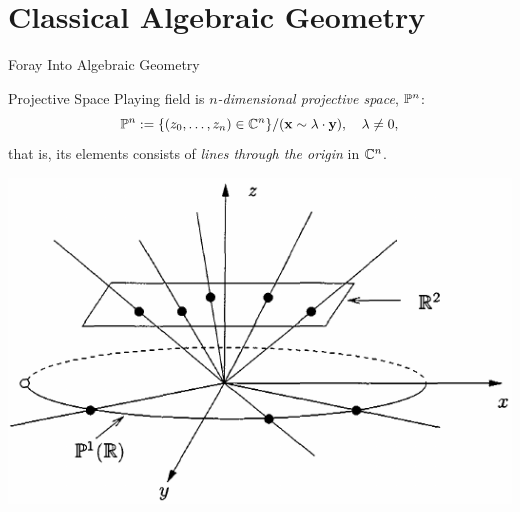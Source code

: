 \section{Classical Algebraic Geometry}

\begin{frame}{Foray Into Algebraic Geometry}
    \begin{block}{Projective Space}
    Playing field is $n$\emph{-dimensional projective space}, $\mathbb{P}^{n}$:
        $$ \mathbb{P}^{n} := \{ (z_{0}, \ldots, z_{n}) \in \mathbb{C}^{n} \} / (\vb{x} \sim \lambda \cdot \vb{y}), \quad \lambda \neq 0, $$
    that is, its elements consists of \emph{lines through the origin} in $\mathbb{C}^{n}$.
    \end{block}
    

    \begin{center}
        \includegraphics[height=0.35\textwidth, angle=0]{resources/projective-space}
    \end{center}

\end{frame}

